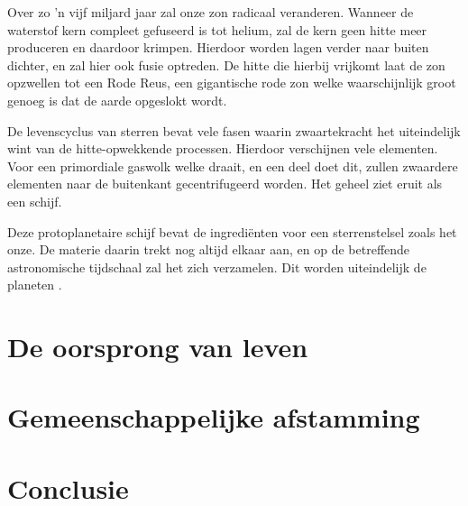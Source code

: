 \documentclass{article}
\begin{document}
        Over zo 'n vijf miljard jaar zal onze zon radicaal veranderen. Wanneer de waterstof kern compleet gefuseerd is tot helium, zal de kern geen hitte meer produceren en daardoor krimpen. Hierdoor worden lagen verder naar buiten dichter, en zal hier ook fusie optreden. De hitte die hierbij vrijkomt laat de zon opzwellen tot een Rode Reus, een gigantische rode zon welke waarschijnlijk groot genoeg is dat de aarde opgeslokt wordt.
        
        De levenscyclus van sterren bevat vele fasen waarin zwaartekracht het uiteindelijk wint van de hitte-opwekkende processen. Hierdoor verschijnen vele elementen. Voor een primordiale gaswolk welke draait, en een deel doet dit, zullen zwaardere elementen naar de buitenkant gecentrifugeerd worden. Het geheel ziet eruit als een schijf.   
        
        Deze protoplanetaire schijf bevat de ingredi\"enten voor een sterrenstelsel zoals het onze. De materie daarin trekt nog altijd elkaar aan, en op de betreffende astronomische tijdschaal zal het zich verzamelen. Dit worden uiteindelijk de planeten \cite{Zhu2015}.
    
    \section{De oorsprong van leven}
    
    \section{Gemeenschappelijke afstamming}
    
    \section{Conclusie}
      
\end{document}
